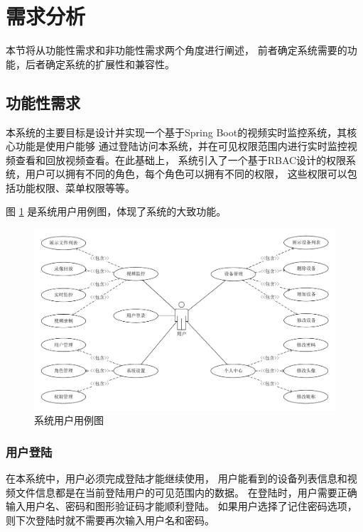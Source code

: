 \section{需求分析}


本节将从功能性需求和非功能性需求两个角度进行阐述，
前者确定系统需要的功能，后者确定系统的扩展性和兼容性。

\subsection{功能性需求}
本系统的主要目标是设计并实现一个基于Spring Boot的视频实时监控系统，其核心功能是使用户能够
通过登陆访问本系统，并在可见权限范围内进行实时监控视频查看和回放视频查看。在此基础上，
系统引入了一个基于RBAC设计的权限系统，用户可以拥有不同的角色，每个角色可以拥有不同的权限，
这些权限可以包括功能权限、菜单权限等等。

图 \ref{Fig:case} 是系统用户用例图，体现了系统的大致功能。
\begin{figure}[ht]
    \centering   
    \includegraphics[width=1\linewidth]{./Figure/IMG_case.pdf}
    \caption{系统用户用例图}\label{Fig:case}
\end{figure}

\subsubsection{用户登陆}
在本系统中，用户必须完成登陆才能继续使用，
用户能看到的设备列表信息和视频文件信息都是在当前登陆用户的可见范围内的数据。
在登陆时，用户需要正确输入用户名、密码和图形验证码才能顺利登陆。
如果用户选择了记住密码选项，则下次登陆时就不需要再次输入用户名和密码。

